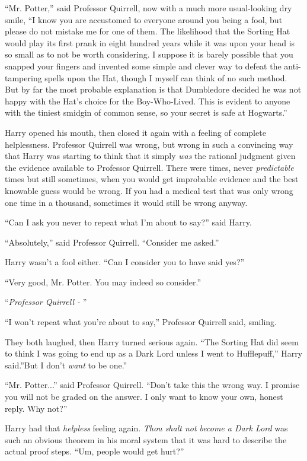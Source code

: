 ``Mr. Potter,'' said Professor Quirrell, now with a much more
usual-looking dry smile, ``I know you are accustomed to everyone around
you being a fool, but please do not mistake me for one of them. The
likelihood that the Sorting Hat would play its first prank in eight
hundred years while it was upon your head is so small as to not be worth
considering. I suppose it is barely possible that you snapped your
fingers and invented some simple and clever way to defeat the
anti-tampering spells upon the Hat, though I myself can think of no such
method. But by far the most probable explanation is that Dumbledore
decided he was not happy with the Hat's choice for the Boy-Who-Lived.
This is evident to anyone with the tiniest smidgin of common sense, so
your secret is safe at Hogwarts.''

Harry opened his mouth, then closed it again with a feeling of complete
helplessness. Professor Quirrell was wrong, but wrong in such a
convincing way that Harry was starting to think that it simply
\emph{was} the rational judgment given the evidence available to
Professor Quirrell. There were times, never \emph{predictable} times but
still sometimes, when you would get improbable evidence and the best
knowable guess would be wrong. If you had a medical test that was only
wrong one time in a thousand, sometimes it would still be wrong anyway.

``Can I ask you never to repeat what I'm about to say?'' said Harry.

``Absolutely,'' said Professor Quirrell. ``Consider me asked.''

Harry wasn't a fool either. ``Can I consider you to have said yes?''

``Very good, Mr. Potter. You may indeed so consider.''

``\emph{Professor Quirrell -} ''

``I won't repeat what you're about to say,'' Professor Quirrell said,
smiling.

They both laughed, then Harry turned serious again. ``The Sorting Hat
did seem to think I was going to end up as a Dark Lord unless I went to
Hufflepuff,'' Harry said.''But I don't \emph{want} to be one.''

``Mr. Potter...'' said Professor Quirrell. ``Don't take this the
wrong way. I promise you will not be graded on the answer. I only want
to know your own, honest reply. Why not?''

Harry had that \emph{helpless} feeling again. \emph{Thou shalt not
become a Dark Lord} was such an obvious theorem in his moral system that
it was hard to describe the actual proof steps. ``Um, people would get
hurt?''

